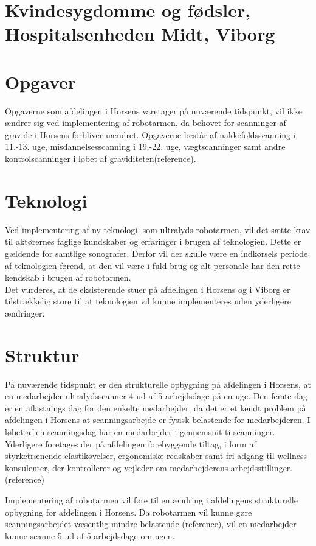 \section{Kvindesygdomme og fødsler, Hospitalsenheden Midt, Viborg}

\section{Opgaver}
Opgaverne som afdelingen i Horsens varetager på nuværende tidspunkt, vil ikke ændrer sig ved implementering af robotarmen, da behovet for scanninger af gravide i Horsens forbliver uændret. Opgaverne består af nakkefoldsscanning i 11.-13. uge, misdannelsesscanning i 19.-22. uge, vægtscanninger samt andre kontrolscanninger i løbet af graviditeten(reference). 

\section{Teknologi}
Ved implementering af ny teknologi, som ultralyds robotarmen, vil det sætte krav til aktørernes faglige kundskaber og erfaringer i brugen af teknologien. Dette er gældende for samtlige sonografer. Derfor vil der skulle være en indkørsels periode af teknologien førend, at den vil være i fuld brug og alt personale har den rette kendskab i brugen af robotarmen. \\
Det vurderes, at de eksisterende stuer på afdelingen i Horsens og i Viborg er tilstrækkelig store til at teknologien vil kunne implementeres uden yderligere ændringer.

\section{Struktur}
På nuværende tidspunkt er den strukturelle opbygning på afdelingen i Horsens, at en medarbejder ultralydsscanner 4 ud af 5 arbejdsdage på en uge. Den femte dag er en aflastnings dag for den enkelte medarbejder, da det er et kendt problem på afdelingen i Horsens at scanningsarbejde er fysisk belastende for medarbejderen. I løbet af en scanningsdag har en medarbejder i gennemsnit ti scanninger. Yderligere foretages der på afdelingen forebyggende tiltag, i form af styrketrænende elastikøvelser, ergonomiske redskaber samt fri adgang til wellness konsulenter, der kontrollerer og vejleder om medarbejderens arbejdsstillinger. (reference)

Implementering af robotarmen vil føre til en ændring i afdelingens strukturelle opbygning for afdelingen i Horsens. Da robotarmen vil kunne gøre scanningsarbejdet væsentlig mindre belastende (reference), vil en medarbejder kunne scanne 5 ud af 5 arbejdsdage om ugen.  

